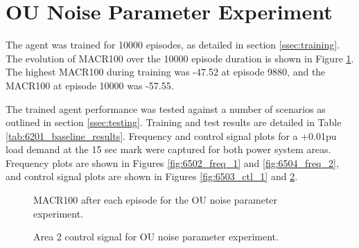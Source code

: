 \section{OU Noise Parameter Experiment}
The agent was trained for 10000 episodes, as detailed in section \ref{ssec:training}. The evolution of MACR100 over the 10000 episode duration is shown in Figure \ref{fig:6501_average_reward}. The highest MACR100 during training was -47.52 at episode 9880, and the MACR100 at episode 10000 was -57.55.

The trained agent performance was tested against a number of scenarios as outlined in section \ref{ssec:testing}. Training and test results are detailed in Table \ref{tab:6201_baseline_results}. Frequency and control signal plots for a +0.01pu load demand at the 15 sec mark were captured for both power system areas. Frequency plots are shown in Figures \ref{fig:6502_freq_1} and \ref{fig:6504_freq_2}, and control signal plots are shown in Figures \ref{fig:6503_ctl_1} and \ref{fig:6505_ctl_2}.

\vspace{2cm}

\begin{figure}[h]
	\centering
	
	\caption{MACR100 after each episode for the OU noise parameter experiment.}\label{fig:6501_average_reward}
\end{figure}



\begin{figure}[h]
	\centering
	
	
	\vspace{-0.5cm}
	\caption{Area 1 frequency response for OU noise parameter experiment.}\label{fig:6502_freq_1}
	
	\vspace{0.5cm}
	
	
	\vspace{-0.5cm}
	\caption{Area 1 control signal for OU noise parameter experiment.}\label{fig:6503_ctl_1}
	
	\vspace{0.5cm}
	
	
	\vspace{-0.5cm}
	\caption{Area 2 frequency response for OU noise parameter experiment.}\label{fig:6504_freq_2}
	
	\vspace{0.5cm}
				
	
	\vspace{-0.5cm}
	\caption{Area 2 control signal for OU noise parameter experiment.}\label{fig:6505_ctl_2}
\end{figure}